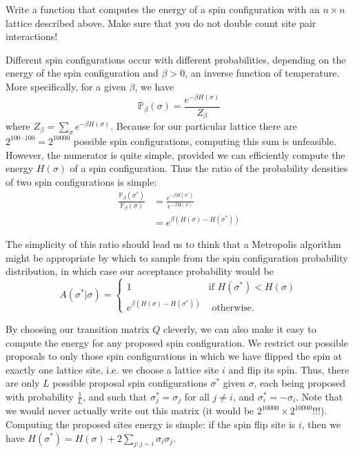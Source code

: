 \begin{problem}
Write a function that computes the energy of a spin configuration with an $n \times n$ lattice described above. Make sure that you do not double count site pair interactions!
\end{problem}

Different spin configurations occur with different probabilities, depending on the energy of the spin configuration and $\beta > 0$, an inverse function of temperature. More specifically, for a given $\beta$, we have
\begin{equation*}
\mathbb{P}_{\beta}(\sigma) = \frac{e^{-\beta H(\sigma)}}{Z_{\beta}}
\end{equation*}
where $Z_{\beta} = \sum_{\sigma} e^{-\beta H(\sigma)}$. Because for our particular lattice there are $2^{100 \cdot 100} = 2^{10000}$ possible spin configurations, computing this sum is unfeasible. However, the numerator is quite simple, provided we can efficiently compute the energy $H(\sigma)$ of a spin configuration. Thus the ratio of the probability densities of two spin configurations is simple: 
\begin{align*}
\frac{\mathbb{P}_{\beta}(\sigma^{*})}{\mathbb{P}_{\beta}(\sigma)} & = \frac{e^{-\beta H(\sigma^{*})}}{e^{-\beta H(\sigma)}} \\
& = e^{\beta (H(\sigma) - H(\sigma^{*}))}
\end{align*}

The simplicity of this ratio should lead us to think that a Metropolis algorithm might be appropriate by which to sample from the spin configuration probability distribution, in which case our acceptance probability would be
\begin{equation*}
A(\sigma^{*} | \sigma) = \begin{cases} 1 & \mbox{if } H(\sigma^{*}) < H(\sigma) \\ e^{\beta (H(\sigma) - H(\sigma^{*}))} & \mbox{ otherwise.} \end{cases}
\end{equation*}

By choosing our transition matrix $Q$ cleverly, we can also make it easy to compute the energy for any proposed spin configuration. We restrict our possible proposals to only those spin configurations in which we have flipped the spin at exactly one lattice site, i.e. we choose a lattice site $i$ and flip its spin. Thus, there are only $L$ possible proposal spin configurations $\sigma^{*}$ given $\sigma$, each being proposed with probability $\frac{1}{L}$, and such that $\sigma_{j}^{*} = \sigma_{j}$ for all $j \neq i$, and $\sigma_{i}^{*} = - \sigma_{i}$. Note that we would never actually write out this matrix (it would be $2^{10000} \times 2^{10000}$!!!). Computing the proposed sites energy is simple: if the spin flip site is $i$, then we have $H(\sigma^{*}) = H(\sigma) + 2\sum_{j: j \sim i} \sigma_{i}\sigma_{j}$.

